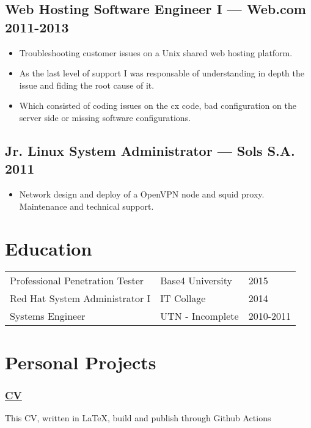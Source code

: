 \documentclass[11pt]{article}
\newcommand{\git}[2]{\href {https://github.com/azimut/{#2}} {#1}}
\begin{document}
\subsection{Web Hosting Software Engineer I --- Web.com \hfill 2011-2013}
\begin{itemize}
  \setlength{\parskip}{0pt}
  \setlength{\itemsep}{0pt plus 1pt}
\item Troubleshooting customer issues on a Unix shared web hosting platform.
\item As the last level of support I was responsable of understanding in depth the issue and fiding the root cause of it.
\item Which consisted of coding issues on the cx code, bad configuration on the server side or missing software configurations.
\end{itemize}

\subsection{Jr. Linux System Administrator --- Sols S.A. \hfill 2011}
\begin{itemize}
  \setlength{\parskip}{0pt}
  \setlength{\itemsep}{0pt plus 1pt}
\item Network design and deploy of a OpenVPN node and squid proxy. Maintenance and technical support.
\end{itemize}


\section{Education}


\begin{tabular}{@{}lll@{}}
  \hspace{.1em} Professional Penetration Tester & Base4 University & 2015 \\
  \hspace{.1em} Red Hat System Administrator I  & IT Collage       & 2014 \\
  \hspace{.1em} Systems Engineer                & UTN - Incomplete & 2010-2011\\
\end{tabular}


\section{Personal Projects}

\subsubsection{\git{CV}{CV}}
This CV, written in LaTeX, build and publish through Github Actions
\end{document}
